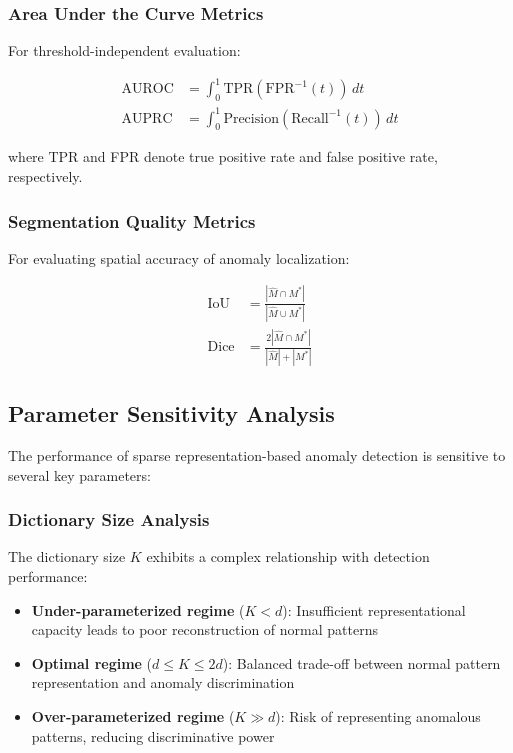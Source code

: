 \documentclass[12pt]{article}
\begin{document}
\subsubsection{Area Under the Curve Metrics}
\label{subsubsec:auc_metrics}

For threshold-independent evaluation:

\begin{align}
    \text{AUROC} & = \int_0^1 \text{TPR}(\text{FPR}^{-1}(t)) \, dt \label{eq:auroc}          \\
    \text{AUPRC} & = \int_0^1 \text{Precision}(\text{Recall}^{-1}(t)) \, dt \label{eq:auprc}
\end{align}

where TPR and FPR denote true positive rate and false positive rate, respectively.

\subsubsection{Segmentation Quality Metrics}
\label{subsubsec:segmentation_metrics}

For evaluating spatial accuracy of anomaly localization:

\begin{align}
    \text{IoU}  & = \frac{|\hat{M} \cap M^*|}{|\hat{M} \cup M^*|} \label{eq:iou}  \\
    \text{Dice} & = \frac{2|\hat{M} \cap M^*|}{|\hat{M}| + |M^*|} \label{eq:dice}
\end{align}

\subsection{Parameter Sensitivity Analysis}
\label{subsec:parameter_sensitivity}

The performance of sparse representation-based anomaly detection is sensitive to several key parameters:

\subsubsection{Dictionary Size Analysis}
\label{subsubsec:dict_size_analysis}

The dictionary size $K$ exhibits a complex relationship with detection performance:

\begin{itemize}[leftmargin=*]
    \item \textbf{Under-parameterized regime} ($K < d$): Insufficient representational capacity leads to poor reconstruction of normal patterns
    \item \textbf{Optimal regime} ($d \leq K \leq 2d$): Balanced trade-off between normal pattern representation and anomaly discrimination
    \item \textbf{Over-parameterized regime} ($K \gg d$): Risk of representing anomalous patterns, reducing discriminative power
\end{itemize}
\end{document}
